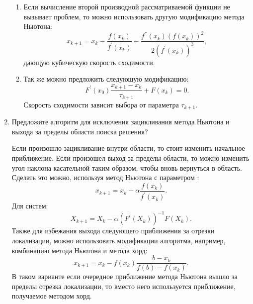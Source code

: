 \documentclass[12pt, a4paper]{article}
\begin{document}
\begin{enumerate}
\begin{enumerate}
\item Если вычисление второй производной рассматриваемой функции не вызывает проблем, то можно использовать другую модификацию метода Ньютона: 
\[ 
x_{k+1} = x_{k} - \frac{f(x_{k})}{f^'(x_{k})} - \frac{f^{''}(x_{k}) (f(x_{k}))^{2}}{2 (f^'(x_{k}))^{3}} ,
\] 
 дающую кубическую скорость сходимости.

\item Так же можно предложить следующую модификацию:
\[
F^'(x_0)\frac{x_{k+1}-x_{k}}{\tau_{k+1}}+F(x_{k})=0.
\]
Скорость сходимости зависит выбора от параметра $\tau_{k+1}$.	
\end{enumerate}

\item Предложите алгоритм для исключения зацикливания метода Ньютона и выхода за пределы области поиска решения?

Если произошло зацикливание внутри области, то стоит изменить начальное приближение. Если произошел выход за пределы области, то можно изменить угол наклона касательной таким образом, чтобы вновь вернуться в область. Сделать это можно, используя метод Ньютона с параметром : 
\[
 x_{k+1}= x_{k} - \alpha \dfrac{f(x_{k})}{f^'(x_{k})} .
\]
Для систем:
\[
X_{k+1}=X_{k}-\alpha (F^'(X_{k}))^{-1}F(X_{k}).
\]
Также для избежания выхода следующего приближения за отрезки локализации, можно использовать модификации алгоритма, например, комбинацию метода Ньютона и метода хорд:
\[
x_{k+1}=x_k - f(x_k)\dfrac{b - x_k}{f(b) - f(x_k)}.
\] 
	В таком варианте если очередное приближение метода Ньютона вышло за пределы отрезка локализации, то вместо него используется приближение, получаемое методом хорд.
\end{enumerate}
\end{document}
